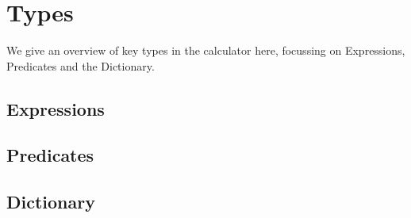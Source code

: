 \section{Types}\label{sec:Types}

We give an overview of key types in the calculator here,
focussing on Expressions, Predicates and the Dictionary.

\subsection{Expressions}


\subsection{Predicates}



\subsection{Dictionary}




